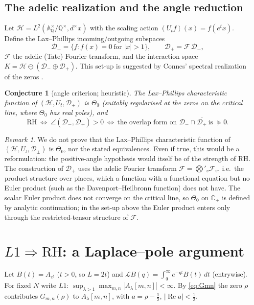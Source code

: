 \documentclass[11pt]{amsart}
\newtheorem{conjecture}[theorem]{Conjecture}
\theoremstyle{definition}
\theoremstyle{remark}
\newtheorem{remark}[theorem]{Remark}
\newcommand{\RH}{\mathrm{RH}}
\renewcommand{\Re}{\operatorname{Re}}
\newcommand{\half}{\tfrac{1}{2}}
\newcommand{\Ad}{\mathbb{A}}
\newcommand{\Q}{\mathbb{Q}}
\newcommand{\C}{\mathbb{C}}
\newcommand{\Hil}{\mathcal{H}}
\newcommand{\Dm}{\mathcal{D}}
\newcommand{\Th}{\Theta}
\begin{document}
\subsection{The adelic realization and the angle reduction}
Let $\Hil=L^2(\Ad_\Q^\times/\Q^\times,d^\times x)$ with the scaling action $(U_tf)(x)=f(e^tx)$.
Define the Lax--Phillips \cite{LP} incoming/outgoing subspaces
\[
   \Dm_-=\{f:f(x)=0\ \text{for } |x|>1\},\qquad \Dm_+=\mathcal F\,\Dm_-,
\]
$\mathcal F$ the adelic (Tate) Fourier transform, and the interaction space
$K=\Hil\ominus(\Dm_-\oplus\Dm_+)$. This set-up is suggested by Connes' spectral realization of the
zeros \cite{Connes}.

\begin{conjecture}[angle criterion; heuristic]\label{thm:angle}
The Lax--Phillips characteristic function of $(\Hil,U_t,\Dm_\pm)$ is $\Th_0$ (suitably
regularised at the zeros on the critical line, where $\Th_0$ has real poles), and
\[
   \RH\ \Longleftrightarrow\ \angle(\Dm_-,\Dm_+)>0\ \Longleftrightarrow\
   \text{the overlap form on }\Dm_-\cap\overline{\Dm_+}\ \text{is}\ \succeq0 .
\]
\end{conjecture}

\begin{remark}
We do not prove that the Lax--Phillips characteristic function of $(\Hil,U_t,\Dm_\pm)$ is
$\Th_0$, nor the stated equivalences. Even if true, this would be a reformulation: the
positive-angle hypothesis would itself be of the strength of RH. The construction of $\Dm_+$ uses
the adelic Fourier transform $\mathcal F=\bigotimes'_v\mathcal F_v$, i.e.\ the product structure
over places, which a function with a functional equation but no Euler product (such as the
Davenport--Heilbronn function) does not have.
The scalar Euler product does not converge on the critical line, so $\Th_0$ on $\C_+$ is defined by
analytic continuation; in the set-up above the Euler product enters only through the
restricted-tensor structure of $\mathcal F$.
\end{remark}

\section{\texorpdfstring{$L1\Rightarrow\RH$}{L1 implies RH}: a Laplace--pole argument}\label{sec:L1}
Let $B(t)=A_{e^t}$ ($t>0$, so $L=2t$) and $\mathcal LB(q)=\int_0^\infty e^{-qt}B(t)\,dt$
(entrywise). For fixed $N$ write \textbf{$L1$}: $\sup_{\lambda>1}\max_{m,n}|A_\lambda[m,n]|<\infty$.
By \eqref{eq:Gmn} the zero $\rho$ contributes $G_{m,n}(\rho)$ to $A_\lambda[m,n]$, with
$a=\rho-\half$, $|\Re a|<\half$.
\end{document}
